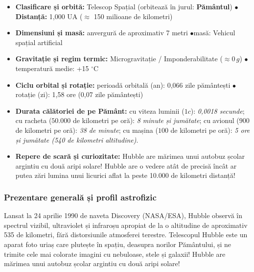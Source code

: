 \begin{tcolorbox}[orbitardata, title={\textbf{Repere esențiale: Telescopul Spațial Hubble}}]
\small
\begin{itemize}[leftmargin=1.4em, itemsep=2pt, topsep=2pt]
  \item \textbf{Clasificare și orbită:} Telescop Spațial (orbitează în jurul: \textbf{Pământul}) \quad$\bullet$\quad \textbf{Distanță:} 1,000 UA ($\approx$ 150 milioane de kilometri)
  \item \textbf{Dimensiuni și masă:} anvergură de aproximativ 7 metri \quad$\bullet$\quad masă: Vehicul spațial artificial
  \item \textbf{Gravitație și regim termic:} Microgravitație / Imponderabilitate ($\approx 0\,g$) \quad$\bullet$\quad temperatură medie: +15 $^\circ$C
  \item \textbf{Ciclu orbital și rotație:} perioadă orbitală (an): 0,066 zile pământești \quad$\bullet$\quad rotație (zi): 1,58 ore (0,07 zile pământești)
  \item \textbf{Durata călătoriei de pe Pământ:} cu viteza luminii ($1c$): \emph{0,0018 secunde}; cu racheta ($50.000$ de kilometri pe oră): \emph{8 minute și jumătate}; cu avionul ($900$ de kilometri pe oră): \emph{38 de minute}; cu mașina ($100$ de kilometri pe oră): \emph{5 ore și jumătate (540 de kilometri altitudine)}.
  \item \textbf{Repere de scară și curiozitate:} Hubble are mărimea unui autobuz școlar argintiu cu două aripi solare! Hubble are o vedere atât de precisă încât ar putea zări lumina unui licurici aflat la peste 10.000 de kilometri distanță!
\end{itemize}
\end{tcolorbox}

\subsubsection*{Prezentare generală și profil astrofizic}
Lansat la 24 aprilie 1990 de naveta Discovery (NASA/ESA), Hubble observă în spectrul vizibil, ultraviolet și infraroșu apropiat de la o altitudine de aproximativ 535 de kilometri, fără distorsiunile atmosferei terestre. Telescopul Hubble este un aparat foto uriaș care plutește în spațiu, deasupra norilor Pământului, și ne trimite cele mai colorate imagini cu nebuloase, stele și galaxii! Hubble are mărimea unui autobuz școlar argintiu cu două aripi solare!

